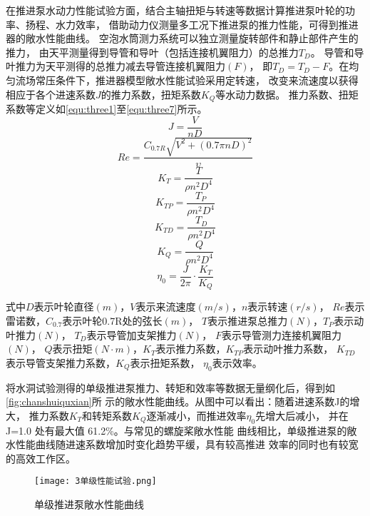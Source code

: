 在推进泵水动力性能试验方面，结合主轴扭矩与转速等数据计算推进泵叶轮的功率、扬程、水力效率，
借助动力仪测量多工况下推进泵的推力性能，可得到推进器的敞水性能曲线。
空泡水筒测力系统可以独立测量旋转部件和静止部件产生的推力，
由天平测量得到导管和导叶（包括连接机翼阻力）的总推力$T_{D}$。
导管和导叶推力为天平测得的总推力减去导管连接机翼阻力$(F)$，
即$T_{D}=T_{D}-F$。在均匀流场常压条件下，推进器模型敞水性能试验采用定转速，
改变来流速度以获得相应于各个进速系数$J$的推力系数，扭矩系数$K_{Q}$等水动力数据。
推力系数、扭矩系数等定义如\autoref{equ:three1}至\autoref{equ:three7}所示。
\begin{equation}
    \label{equ:three1}
    J=\frac{V}{nD} 
\end{equation}
\begin{equation}
    \label{equ:three2}
    Re =\frac{C_{0.7R}\sqrt{V^{2}+\left ( 0.7\pi nD \right )^{2}   }  }{\upsilon } 
\end{equation}
\begin{equation}
    \label{equ:three3}
    K_{T}=\frac{T}{\rho n^{2}D^{4}  }  
\end{equation}
\begin{equation}
    \label{equ:three4}
    K_{TP}=\frac{T_{P} }{\rho n^{2}D^{4}  }  
\end{equation}
\begin{equation}
    \label{equ:three5}
    K_{TD}=\frac{T_{D} }{\rho n^{2}D^{4}  }  
\end{equation}
\begin{equation}
    \label{equ:three6}
    K_{Q}=\frac{Q}{\rho n^{2}D^{4}  }  
\end{equation}
\begin{equation}
    \label{equ:three7}
    \eta _{0} =\frac{J}{2\pi } \cdot \frac{K_{T} }{K_{Q}} 
\end{equation}

式中$D$表示叶轮直径$(m)$，$V$表示来流速度$(m/s)$，$n$表示转速$(r/s)$，
$Re$表示雷诺数，$C_{0.7}$表示叶轮0.7R处的弦长$(m)$，
$T$表示推进泵总推力$(N)$，$T_{P}$表示动叶推力$(N)$，
$T_{D} $表示导管加支架推力$(N)$，
$F$表示导管测力连接机翼阻力$(N)$，
$Q$表示扭矩$(N \cdot m)$，$K_{T}$表示推力系数，$K_{TP}$表示动叶推力系数，
$K_{TD}$表示导管支架推力系数，$K_{Q}$表示扭矩系数，
$\eta _{0}$表示效率。

将水洞试验测得的单级推进泵推力、转矩和效率等数据无量纲化后，得到如\autoref{fig:chanshuiquxian}所
示的敞水性能曲线。从图中可以看出：随着进速系数J的增大，
推力系数$K_T$和转矩系数$K_Q$逐渐减小，而推进效率$\eta_0$先增大后减小，
并在 J=1.0 处有最大值 61.2\%。与常见的螺旋桨敞水性能
曲线相比，单级推进泵的敞水性能曲线随进速系数增加时变化趋势平缓，具有较高推进
效率的同时也有较宽的高效工作区。
\begin{figure}[htbp]
    \centering
    \texttt{[image: 3单级性能试验.png]}
    \caption{\label{fig:chanshuiquxian}单级推进泵敞水性能曲线}
\end{figure}

